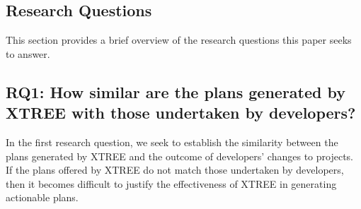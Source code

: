 \documentclass[10pt,journal,compsoc]{IEEEtran}
\newcommand{\bi}{\begin{itemize}} %
\newcommand{\ei}{\end{itemize}}
\newcommand{\tion}[1]{\S\ref{sect:#1}}
\begin{document}

\subsection{Research Questions}
\label{sect:rqs}


This section provides a brief overview of the research questions this paper seeks to answer.

\subsection*{RQ1: How similar are the plans generated by XTREE with those undertaken by developers?}

In the first research question, we seek to establish the similarity between the plans generated by XTREE and the outcome of developers' changes to projects. If the plans offered by XTREE do not match those undertaken by developers, then it becomes difficult to justify the effectiveness of XTREE in generating actionable plans.
\end{document}
